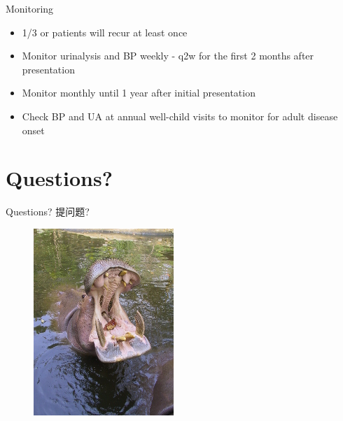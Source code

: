 \begin{frame}{Monitoring}

\begin{itemize}
\itemsep1pt\parskip0pt
\item
  1/3 or patients will recur at least once
\item
  Monitor urinalysis and BP weekly - q2w for the first 2 months after
  presentation
\item
  Monitor monthly until 1 year after initial presentation
\item
  Check BP and UA at annual well-child visits to monitor for adult
  disease onset
\end{itemize}

\end{frame}

\section{Questions?}\label{questions}

\begin{frame}{Questions? 提问题?}

\begin{figure}[htbp]
\centering
\includegraphics{./img/img_0510_200.jpg}
\caption{}
\end{figure}

\end{frame}
